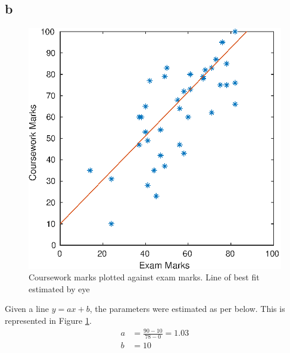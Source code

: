 \subsection*{b}
\begin{figure}[h]
	\includegraphics[scale=0.6, center]{./eps/topic1_b.eps}
	\caption{Coursework marks plotted against exam marks. Line of best fit estimated by eye}
	\label{fig:Topic1-b}
\end{figure}
Given a line $y=ax+b$, the parameters were estimated as per below. This is represented in Figure \ref{fig:Topic1-b}.
\begin{equation}
\begin{split}
	a &= \frac{90-10}{78-0} = 1.03 \\
	b &= 10
\end{split}
\end{equation}

\pagebreak

